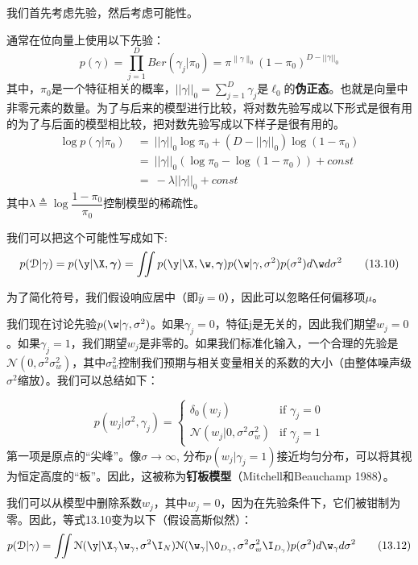 \documentclass[a4paper]{article}
\begin{document}
我们首先考虑先验，然后考虑可能性。 

通常在位向量上使用以下先验： 
\begin{equation}
	p(\gamma)=\prod_{j=1}^D Ber(\gamma_j|\pi_0)=\pi^{\parallel\gamma\parallel_0}(1-\pi_0)^{D-||\gamma||_0}\tag{13.6}
\end{equation}
其中，$\pi_0$是一个特征相关的概率，$||\gamma||_0=\sum\nolimits_{j=1}^D\gamma_j$是$\ell
_0$的\textbf{伪正态}。也就是向量中非零元素的数量。为了与后来的模型进行比较，将对数先验写成以下形式是很有用的为了与后面的模型相比较，把对数先验写成以下样子是很有用的。
\begin{align}
	\log p(\gamma|\pi_0)\ &=\ ||\gamma||_0\log \pi_0+(D-||\gamma ||_0)\log (1-\pi_0)\tag{13.7}\\
	&=\ ||\gamma ||_0(\log \pi_0-\log (1-\pi_0))+const\tag{13.8}\\
	&=\ -\lambda||\gamma ||_0+const\tag{13.9}
\end{align}
其中$\lambda\triangleq\log \dfrac{1-\pi_0}{\pi_0}$控制模型的稀疏性。 

我们可以把这个可能性写成如下:
\begin{equation}
	p(\mathcal{D}|\gamma )=p(\y|\X,\boldsymbol{\gamma } )=\iint p(\y|\X,\w,\boldsymbol{\gamma })p(\w|\gamma ,\sigma ^2)p(\sigma ^2)d\w d\sigma^2\tag{13.10}
\end{equation}

为了简化符号，我们假设响应居中（即$\overline{y}=0$），因此可以忽略任何偏移项$\mu$。 

我们现在讨论先验$p(\w|\gamma,\sigma^2)$。如果$\gamma_j=0$，特征j是无关的，因此我们期望$w_j=0$。如果$\gamma_j=1$，我们期望$w_j$是非零的。如果我们标准化输入，一个合理的先验是$\mathcal{N}(0,\sigma^2\sigma_w^2)$，其中$\sigma_w^2$控制我们预期与相关变量相关的系数的大小（由整体噪声级$\sigma^2$缩放）。我们可以总结如下： 

\begin{equation}
	p(w_j|\sigma^2,\gamma_j)=\left\{ 
	\begin{array}{ll}
	
	\delta_0(w_j) & \text{if } \gamma_j=0\\
	\mathcal{N}(w_j|0,\sigma^2\sigma_w^2) & \text{if } \gamma_j=1
	\end{array} \right. \tag{13.11}
\end{equation}
第一项是原点的“尖峰”。像$\sigma \to \infty$, 分布$p(w_j|\gamma_j=1)$接近均匀分布，可以将其视为恒定高度的“板”。因此，这被称为\textbf{钉板模型}（Mitchell和Beauchamp 1988）。

我们可以从模型中删除系数$w_j$，其中$w_j=0$，因为在先验条件下，它们被钳制为零。因此，等式13.10变为以下（假设高斯似然）：
\begin{equation}
	p(\mathcal{D}|\gamma )=\iint \mathcal{N}(\y|\X_\gamma\w_\gamma,\sigma^2\I_N)\mathcal{N}(\w_\gamma|\0_{D_\gamma},\sigma^2\sigma_w^2\I_{D_\gamma})p(\sigma^2)d\w_\gamma d \sigma^2\tag{13.12}
\end{equation}
\end{document}
